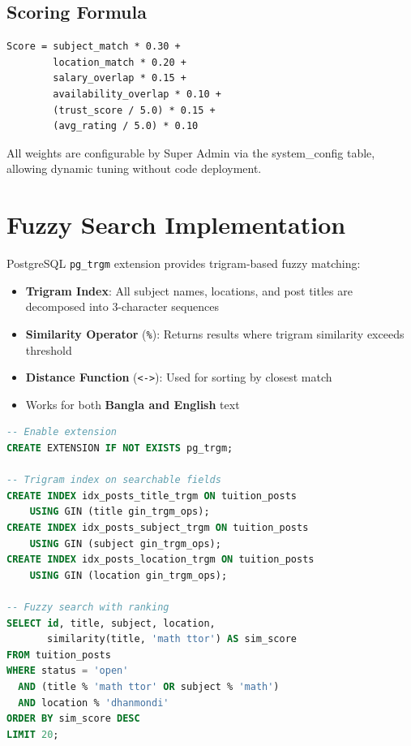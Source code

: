 \documentclass[12pt,a4paper,twoside]{report}
\begin{document}
\subsection{Scoring Formula}
\begin{verbatim}
Score = subject_match * 0.30 +
        location_match * 0.20 +
        salary_overlap * 0.15 +
        availability_overlap * 0.10 +
        (trust_score / 5.0) * 0.15 +
        (avg_rating / 5.0) * 0.10
\end{verbatim}

All weights are configurable by Super Admin via the system\_config table, allowing dynamic tuning without code deployment.

\section{Fuzzy Search Implementation}

PostgreSQL \texttt{pg\_trgm} extension provides trigram-based fuzzy matching:

\begin{itemize}
    \item \textbf{Trigram Index}: All subject names, locations, and post titles are decomposed into 3-character sequences
    \item \textbf{Similarity Operator} (\texttt{\%}): Returns results where trigram similarity exceeds threshold
    \item \textbf{Distance Function} (\texttt{<->}): Used for sorting by closest match
    \item Works for both \textbf{Bangla and English} text
\end{itemize}

\begin{lstlisting}[style=code, language=SQL, caption={Fuzzy Search Query Example}]
-- Enable extension
CREATE EXTENSION IF NOT EXISTS pg_trgm;

-- Trigram index on searchable fields
CREATE INDEX idx_posts_title_trgm ON tuition_posts 
    USING GIN (title gin_trgm_ops);
CREATE INDEX idx_posts_subject_trgm ON tuition_posts 
    USING GIN (subject gin_trgm_ops);
CREATE INDEX idx_posts_location_trgm ON tuition_posts 
    USING GIN (location gin_trgm_ops);

-- Fuzzy search with ranking
SELECT id, title, subject, location, 
       similarity(title, 'math ttor') AS sim_score
FROM tuition_posts
WHERE status = 'open'
  AND (title % 'math ttor' OR subject % 'math')
  AND location % 'dhanmondi'
ORDER BY sim_score DESC
LIMIT 20;
\end{lstlisting}
\end{document}
